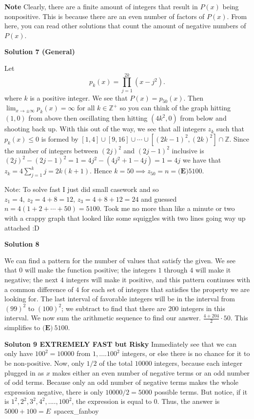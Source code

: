 \begin{enumerate}
 \textbf{Note} Clearly, there are a finite amount of integers that result in $P(x)$ being nonpositive. This is because there are an even number of factors of $P(x).$ From here, you can read other solutions that count the amount of negative numbers of $P(x).$




\textbf{Solution 7 (General)}

Let
 \[p_k(x)=\prod_{j=1}^{2k}(x-j^2).\]where $k$ is a positive integer. We see that $P(x)=p_{50}(x).$ Then $\lim_{x\to\pm\infty}p_k(x)=\infty$ for all $k\in\mathbb{Z}^+$ so you can think of the graph hitting $(1,0)$ from above then oscillating then hitting $(4k^2,0)$ from below and shooting back up. With this out of the way, we see that all integers $z_k$ such that $p_k(x)\le 0$ is formed by $[1,4]\cup [9,16]\cup \cdots\cup [(2k-1)^2, (2k)^2]\cap\mathbb{Z}.$ Since the number of integers between $(2j)^2$ and $(2j-1)^2$ inclusive is $(2j)^2-(2j-1)^2=1=4j^2-(4j^2+1-4j)=1=4j$ we have that $z_k=4\sum_{j=1}^k j=2k(k+1).$ Hence  $k=50\implies z_{50}=n=\boxed{\textbf{(E)}5100}.$

 
Note: To solve fast I just did small casework and so $z_1=4,\, z_2=4+8=12,\, z_3=4+8+12=24$ and guessed $n=4(1+2+\cdots+50)=5100.$ Took me no more than like a minute or two with a crappy graph that looked like some squiggles with two lines going way up attached :D

 



\textbf{Solution 8}

We can find a pattern for the number of values that satisfy the given. We see that $0$ will make the function positive; the integers $1$ through $4$ will make it negative; the next $4$ integers will make it positive, and this pattern continues with a common difference of $4$ for each set of integers that satisfies the property we are looking for. The last interval of favorable integers will be in the interval from $(99)^2$ to $(100)^2$; we subtract to find that there are $200$ integers in this interval. We now sum the arithmetic sequence to find our answer. $\frac{4+204}{2} \cdot50$. This simplifies to $\textbf{(E)}\ \boxed{5100}$.

 \textbf{Soluton 9 EXTREMELY FAST but Risky} Immediately see that we can only have $100^2=10000$ from $1, .... 100^2$ integers, or else there is no chance for it to be non-positive. Now, only $1/2$ of the total $10000$ integers, because each integer plugged in as $x$ makes either an even number of negative terms or an odd number of odd terms. Because only an odd number of negative terms makes the whole expression negative, there is only $10000/2=5000$ possible terms. But notice, if it is $1^2, 2^2, 3^2, 4^2, ...., 100^2$, the expression is equal to $0$. Thus, the answer is $5000+100 = \boxed{E}$~spacex\_fanboy


\end{enumerate}

